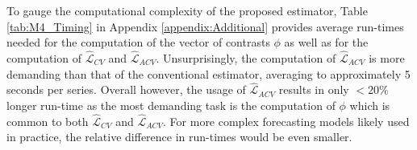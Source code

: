 \documentclass[11pt,dvipsnames]{article}
\begin{document}
To gauge the computational complexity of the proposed estimator, Table \ref{tab:M4_Timing} in Appendix \ref{appendix:Additional} provides average run-times needed for the computation of the vector of contrasts $ \phi $ as well as for the computation of $ \widehat{\mathcal{L}}_{CV} $ and $ \widehat{\mathcal{L}}_{ACV} $. Unsurprisingly, the computation of $ \widehat{\mathcal{L}}_{ACV} $ is more demanding than that of the conventional estimator, averaging to approximately 5 seconds per series. Overall however, the usage of $ \widehat{\mathcal{L}}_{ACV} $ results in only $ <20\% $ longer run-time as the most demanding task is the computation of $ \phi $ which is common to both $ \widehat{\mathcal{L}}_{CV} $ and $ \widehat{\mathcal{L}}_{ACV} $. For more complex forecasting models likely used in practice, the relative difference in run-times would be even smaller.
\end{document}
